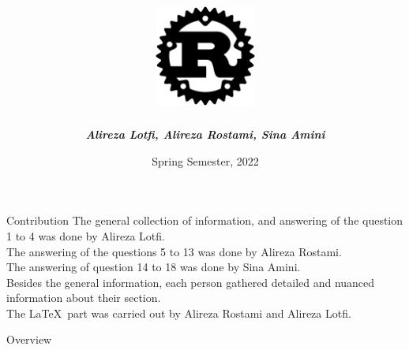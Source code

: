\documentclass[10pt,xcolor={dvipsnames}, aspectratio=169]{beamer}
\title[Shiraz University]{\includegraphics[width=0.25\textwidth]{Images/Rust.png}}
\author{\textit{\textbf{Alireza Lotfi, Alireza Rostami, Sina Amini}}}
\institute[Shiraz Universtiy]
{
	Department of Computer Science, Engineering \& IT \\
	Shiraz University
}
\date{Spring Semester, 2022}
\begin{document}
\begin{frame}
  \titlepage
\end{frame}

\begin{frame}{Contribution}
    The general collection of information, and answering of the question 1 to 4 was done by Alireza Lotfi. \\
    The answering of the questions 5 to 13 was done by Alireza Rostami. \\
    The answering of question 14 to 18 was done by Sina Amini. \\
    Besides the general information, each person gathered detailed and nuanced information about their section. \\
    The \LaTeX \, part was carried out by Alireza Rostami and Alireza Lotfi.
\end{frame}

\begin{frame}{Overview}
    \begin{multicols*}{2}
        \tableofcontents
    \end{multicols*}
\end{frame}
\end{document}

